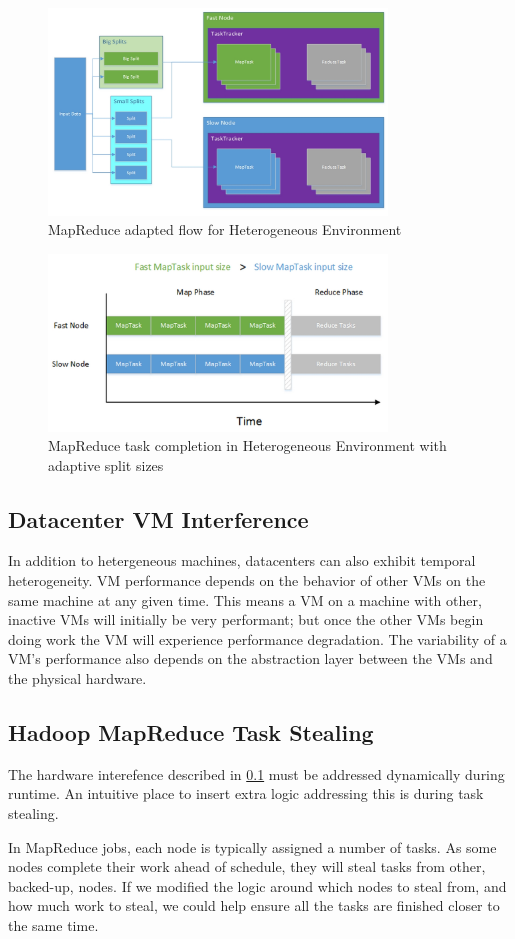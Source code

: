 \begin{figure}[ht!]
\centering
\includegraphics[width=90mm]{adaptive_mr.jpg}
\caption{MapReduce adapted flow for Heterogeneous Environment}
\label{fig:adaptive_mr}
\end{figure}

\begin{figure}[ht!]
\centering
\includegraphics[width=90mm]{adaptive_time.jpg}
\caption{MapReduce task completion in Heterogeneous Environment with adaptive split sizes}
\label{fig:adaptive_time}
\end{figure}

\subsection{Datacenter VM Interference}
\label{sec:interference}
In addition to hetergeneous machines, datacenters can also exhibit temporal heterogeneity.
VM performance depends on the behavior of other VMs on the same machine at any given time.
This means a VM on a machine with other, inactive VMs will initially be very performant;
but once the other VMs begin doing work the VM will experience performance degradation.
The variability of a VM's performance also depends on the abstraction layer between the VMs
and the physical hardware.

\subsection{Hadoop MapReduce Task Stealing}
The hardware interefence described in \ref{sec:interference} must be addressed dynamically
during runtime. An intuitive place to insert extra logic addressing this is during task
stealing.

In MapReduce jobs, each node is typically assigned a number of tasks. As some nodes 
complete their work ahead of schedule, they will steal tasks from other, backed-up,
nodes. If we modified the logic around which nodes to steal from, and how much work
to steal, we could help ensure all the tasks are finished closer to the same time.

